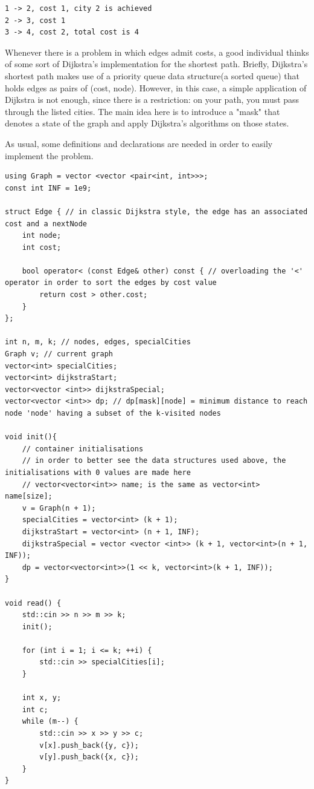 \documentclass[letterpaper]{article}
\begin{document}
\begin{lstlisting}
1 -> 2, cost 1, city 2 is achieved
2 -> 3, cost 1
3 -> 4, cost 2, total cost is 4
\end{lstlisting}

Whenever there is a problem in which edges admit costs, a good individual thinks of some sort of Dijkstra's implementation for the shortest path. Briefly, Dijkstra's shortest path makes use of a priority queue data structure(a sorted queue) that holds edges as pairs of (cost, node). However, in this case, a simple application of Dijkstra is not enough, since there is a restriction: on your path, you must pass through the listed cities. The main idea here is to introduce a "mask" that denotes a state of the graph and apply Dijkstra's algorithms on those states. 

As usual, some definitions and declarations are needed in order to easily implement the problem.

\begin{lstlisting}
using Graph = vector <vector <pair<int, int>>>;
const int INF = 1e9;

struct Edge { // in classic Dijkstra style, the edge has an associated cost and a nextNode
    int node;
    int cost;

    bool operator< (const Edge& other) const { // overloading the '<' operator in order to sort the edges by cost value
        return cost > other.cost;
    }
};

int n, m, k; // nodes, edges, specialCities
Graph v; // current graph
vector<int> specialCities;
vector<int> dijkstraStart;
vector<vector <int>> dijkstraSpecial;
vector<vector <int>> dp; // dp[mask][node] = minimum distance to reach node 'node' having a subset of the k-visited nodes

void init(){
    // container initialisations
    // in order to better see the data structures used above, the initialisations with 0 values are made here
    // vector<vector<int>> name; is the same as vector<int> name[size];
    v = Graph(n + 1);
    specialCities = vector<int> (k + 1);
    dijkstraStart = vector<int> (n + 1, INF);
    dijkstraSpecial = vector <vector <int>> (k + 1, vector<int>(n + 1, INF));
    dp = vector<vector<int>>(1 << k, vector<int>(k + 1, INF));
}

void read() {
    std::cin >> n >> m >> k;
    init();

    for (int i = 1; i <= k; ++i) {
        std::cin >> specialCities[i];
    }

    int x, y;
    int c;
    while (m--) {
        std::cin >> x >> y >> c;
        v[x].push_back({y, c});
        v[y].push_back({x, c});
    }
}
\end{lstlisting}
\end{document}
